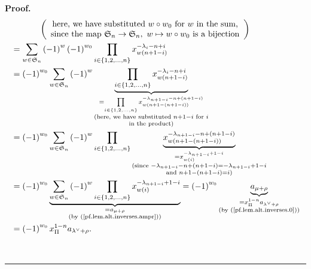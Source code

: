\documentclass[numbers=enddot,12pt,final,onecolumn,notitlepage]{scrartcl}%
\theoremstyle{definition}
\newenvironment{proof}[1][Proof]{\noindent\textbf{#1.} }{\ \rule{0.5em}{0.5em}}
\let\sumnonlimits\sum
\let\prodnonlimits\prod
\renewcommand{\sum}{\sumnonlimits\limits}
\renewcommand{\prod}{\prodnonlimits\limits}
\begin{document}
\begin{proof}
\begin{align}
&  \ \ \ \ \ \ \ \ \ \ \left(
\begin{array}
[c]{c}%
\text{here, we have substituted }w\circ w_{0}\text{ for }w\text{ in the
sum,}\\
\text{since the map }\mathfrak{S}_{n}\rightarrow\mathfrak{S}_{n},\ w\mapsto
w\circ w_{0}\text{ is a bijection}%
\end{array}
\right) \nonumber\\
&  =\sum_{w\in\mathfrak{S}_{n}}\left(  -1\right)  ^{w}\left(  -1\right)
^{w_{0}}\prod_{i\in\left\{  1,2,\ldots,n\right\}  }x_{w\left(  n+1-i\right)
}^{-\lambda_{i}-n+i}\nonumber\\
&  =\left(  -1\right)  ^{w_{0}}\sum_{w\in\mathfrak{S}_{n}}\left(  -1\right)
^{w}\underbrace{\prod_{i\in\left\{  1,2,\ldots,n\right\}  }x_{w\left(
n+1-i\right)  }^{-\lambda_{i}-n+i}}_{\substack{=\prod_{i\in\left\{
1,2,\ldots,n\right\}  }x_{w\left(  n+1-\left(  n+1-i\right)  \right)
}^{-\lambda_{n+1-i}-n+\left(  n+1-i\right)  }\\\text{(here, we have
substituted }n+1-i\text{ for }i\\\text{in the product)}}}\nonumber\\
&  =\left(  -1\right)  ^{w_{0}}\sum_{w\in\mathfrak{S}_{n}}\left(  -1\right)
^{w}\prod_{i\in\left\{  1,2,\ldots,n\right\}  }\underbrace{x_{w\left(
n+1-\left(  n+1-i\right)  \right)  }^{-\lambda_{n+1-i}-n+\left(  n+1-i\right)
}}_{\substack{=x_{w\left(  i\right)  }^{-\lambda_{n+1-i}+1-i}\\\text{(since
}-\lambda_{n+1-i}-n+\left(  n+1-i\right)  =-\lambda_{n+1-i}+1-i\\\text{and
}n+1-\left(  n+1-i\right)  =i\text{)}}}\nonumber\\
&  =\left(  -1\right)  ^{w_{0}}\underbrace{\sum_{w\in\mathfrak{S}_{n}}\left(
-1\right)  ^{w}\prod_{i\in\left\{  1,2,\ldots,n\right\}  }x_{w\left(
i\right)  }^{-\lambda_{n+1-i}+1-i}}_{\substack{=a_{\mu+\rho}\\\text{(by
(\ref{pf.lem.alt.inverses.ampr}))}}}=\left(  -1\right)  ^{w_{0}}%
\underbrace{a_{\mu+\rho}}_{\substack{=x_{\Pi}^{1-n}a_{\lambda^{\vee}+\rho
}\\\text{(by (\ref{pf.lem.alt.inverses.0}))}}}\nonumber\\
&  =\left(  -1\right)  ^{w_{0}}x_{\Pi}^{1-n}a_{\lambda^{\vee}+\rho}.
\label{pf.lem.alt.inverses.a1}%
\end{align}



\end{proof}
\end{document}

